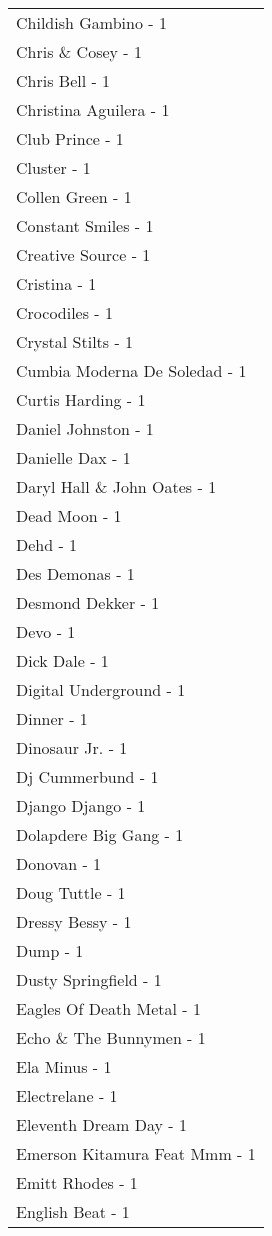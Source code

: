 \documentclass[
]{article}
\begin{document}
\begin{longtable}{l}
Childish Gambino - 1 \\ 
Chris \& Cosey - 1 \\ 
Chris Bell - 1 \\ 
Christina Aguilera - 1 \\ 
Club Prince - 1 \\ 
Cluster - 1 \\ 
Collen Green - 1 \\ 
Constant Smiles - 1 \\ 
Creative Source - 1 \\ 
Cristina - 1 \\ 
Crocodiles - 1 \\ 
Crystal Stilts - 1 \\ 
Cumbia Moderna De Soledad - 1 \\ 
Curtis Harding - 1 \\ 
Daniel Johnston - 1 \\ 
Danielle Dax - 1 \\ 
Daryl Hall \& John Oates - 1 \\ 
Dead Moon - 1 \\ 
Dehd - 1 \\ 
Des Demonas - 1 \\ 
Desmond Dekker - 1 \\ 
Devo - 1 \\ 
Dick Dale - 1 \\ 
Digital Underground - 1 \\ 
Dinner - 1 \\ 
Dinosaur Jr. - 1 \\ 
Dj Cummerbund - 1 \\ 
Django Django - 1 \\ 
Dolapdere Big Gang - 1 \\ 
Donovan - 1 \\ 
Doug Tuttle - 1 \\ 
Dressy Bessy - 1 \\ 
Dump - 1 \\ 
Dusty Springfield - 1 \\ 
Eagles Of Death Metal - 1 \\ 
Echo \& The Bunnymen - 1 \\ 
Ela Minus - 1 \\ 
Electrelane - 1 \\ 
Eleventh Dream Day - 1 \\ 
Emerson Kitamura Feat Mmm - 1 \\ 
Emitt Rhodes - 1 \\ 
English Beat - 1 \\ 

\end{longtable}
\end{document}
